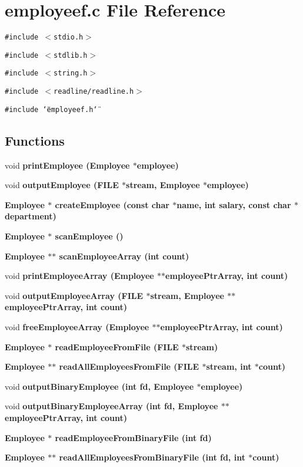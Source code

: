 \section{employeef.c File Reference}
\label{employeef_8c}
{\tt \#include $<$stdio.h$>$}\par
{\tt \#include $<$stdlib.h$>$}\par
{\tt \#include $<$string.h$>$}\par
{\tt \#include $<$readline/readline.h$>$}\par
{\tt \#include \char`\"{}employeef.h\char`\"{}}\par
\subsection*{Functions}
\begin{CompactItemize}
\item 
void \bf{print\-Employee} (\bf{Employee} $\ast$employee)
\item 
void \bf{output\-Employee} (FILE $\ast$stream, \bf{Employee} $\ast$employee)
\item 
\bf{Employee} $\ast$ \bf{create\-Employee} (const char $\ast$name, int salary, const char $\ast$department)
\item 
\bf{Employee} $\ast$ \bf{scan\-Employee} ()
\item 
\bf{Employee} $\ast$$\ast$ \bf{scan\-Employee\-Array} (int count)
\item 
void \bf{print\-Employee\-Array} (\bf{Employee} $\ast$$\ast$employee\-Ptr\-Array, int count)
\item 
void \bf{output\-Employee\-Array} (FILE $\ast$stream, \bf{Employee} $\ast$$\ast$employee\-Ptr\-Array, int count)
\item 
void \bf{free\-Employee\-Array} (\bf{Employee} $\ast$$\ast$employee\-Ptr\-Array, int count)
\item 
\bf{Employee} $\ast$ \bf{read\-Employee\-From\-File} (FILE $\ast$stream)
\item 
\bf{Employee} $\ast$$\ast$ \bf{read\-All\-Employees\-From\-File} (FILE $\ast$stream, int $\ast$count)
\item 
void \bf{output\-Binary\-Employee} (int fd, \bf{Employee} $\ast$employee)
\item 
void \bf{output\-Binary\-Employee\-Array} (int fd, \bf{Employee} $\ast$$\ast$employee\-Ptr\-Array, int count)
\item 
\bf{Employee} $\ast$ \bf{read\-Employee\-From\-Binary\-File} (int fd)
\item 
\bf{Employee} $\ast$$\ast$ \bf{read\-All\-Employees\-From\-Binary\-File} (int fd, int $\ast$count)
\end{CompactItemize}


